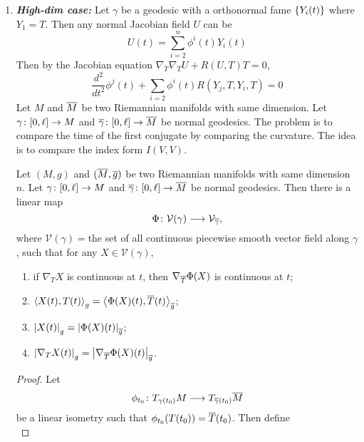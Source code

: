 \begin{enumerate}[label=\arabic{*}.]
	\item \emph{\textbf{High-dim case:}} Let $\gamma$ be a geodesic with a orthonormal fame $\left\{Y_i(t)\right\}$ where $Y_1 = T$. Then any normal Jacobian field $U$ can be
	\begin{equation*}
		U(t) = \sum_{i=2}^n \phi^i(t)Y_i(t)
	\end{equation*}
	Then by the Jacobian equation $\nabla_T\nabla_T U + R(U,T)T = 0$,
	\begin{equation*}
		\frac{d^2}{dt^2}\phi^j(t) + \sum_{i=2}\phi^i(t)R(Y_j,T,Y_i,T) = 0
	\end{equation*}
	Let $M$ and $\overline{M}$ be two Riemannian manifolds with same dimension. Let $\gamma \colon [0,\ell] \rightarrow M$ and $\overline{\gamma} \colon [0,\ell] \rightarrow \overline{M}$ be normal geodesics. The problem is to compare the time of the first conjugate by comparing the curvature. The idea is to compare the index form $I(V,V)$.
	\begin{lem}\label{lem:compind}
		Let $(M,g)$ and $(\overline{M},\overline{g})$ be two Riemannian manifolds with same dimension $n$. Let $\gamma \colon [0,\ell] \rightarrow M$ and $\overline{\gamma} \colon [0,\ell] \rightarrow \overline{M}$ be normal geodesics. Then there is a linear map
		\begin{equation*}
			\Phi \colon \mathcal{V}(\gamma) \longrightarrow \mathcal{V}_{\overline{\gamma}},
		\end{equation*}
		where $\mathcal{V}(\gamma) = $the set of all continuous piecewise smooth vector field along $\gamma$, such that for any $X \in \mathcal{V}(\gamma)$,
		\begin{enumerate}[label=(\arabic{*})]
			\item if $\nabla_T X$ is continuous at $t$, then $\nabla_{\overline{T}}\Phi(X)$ is continuous at $t$;
			\item $\left\langle X(t),T(t) \right\rangle_g = \left\langle \Phi(X)(t),\overline{T}(t) \right\rangle_{\overline{g}}$;
			\item $\left\lvert X(t)\right\lvert_g = \left\lvert\Phi(X)(t)\right\lvert_{\overline{g}}$;
			\item $\left\lvert\nabla_TX(t)\right\lvert_g = \left\lvert\nabla_{\overline{T}}\Phi(X)(t)\right\lvert_{\overline{g}}$.
		\end{enumerate}
	\end{lem}
	\begin{proof}
		Let
		\begin{equation*}
			\phi_{t_0} \colon T_{\gamma(t_0)}M \longrightarrow T_{\overline{\gamma}(t_0)}\overline{M} 
		\end{equation*}
		be a linear isometry such that $\phi_{t_0}(T(t_0)) = \overline{T}(t_0)$. Then define
		\begin{equation*}

\end{equation*}
\end{proof}
\end{enumerate}
